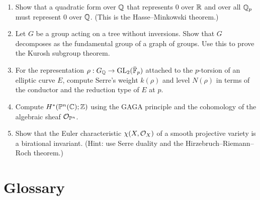 \begin{enumerate}
    \item [I] Show that a quadratic form over \(\mathbb{Q}\) that represents 0 over \(\mathbb{R}\) and over all \(\mathbb{Q}_p\) must represent 0 over \(\mathbb{Q}\). (This is the Hasse--Minkowski theorem.)
    \item [A] Let \(G\) be a group acting on a tree without inversions. Show that \(G\) decomposes as the fundamental group of a graph of groups. Use this to prove the Kurosh subgroup theorem.
    \item [A] For the representation \(\rho: G_{\mathbb{Q}} \to \operatorname{GL}_2(\bar{\mathbb{F}}_p)\) attached to the \(p\)-torsion of an elliptic curve \(E\), compute Serre's weight \(k(\rho)\) and level \(N(\rho)\) in terms of the conductor and the reduction type of \(E\) at \(p\).
    \item [B] Compute \(H^*(\mathbb{P}^n(\mathbb{C}); \mathbb{Z})\) using the GAGA principle and the cohomology of the algebraic sheaf \(\mathcal{O}_{\mathbb{P}^n}\).
    \item [I] Show that the Euler characteristic \(\chi(X, \mathcal{O}_X)\) of a smooth projective variety is a birational invariant. (Hint: use Serre duality and the Hirzebruch--Riemann--Roch theorem.)
\end{enumerate}

\section*{Glossary}


